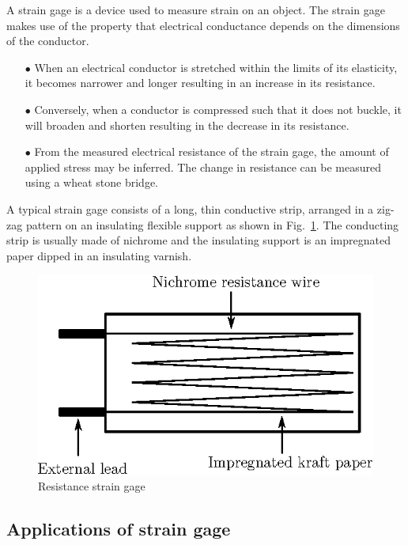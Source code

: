 A strain gage is a device used to measure strain on an object. The strain gage makes use of the property that electrical conductance depends on the dimensions of the conductor.
\begin{itemize}
\itemsep=0pt
\item[$\bullet$] When an electrical conductor is stretched within the limits of its elasticity, it becomes narrower and longer resulting in an increase in its resistance.

\item[$\bullet$] Conversely, when a conductor is compressed such that it does not buckle, it will broaden and shorten resulting in the decrease in its resistance. 

\item[$\bullet$] From the measured electrical resistance of the strain gage, the amount of applied stress may be inferred. The change in resistance can be measured using a wheat stone bridge.
\end{itemize}

A typical strain gage consists of a long, thin conductive strip, arranged in a zig-zag pattern on an insulating flexible support as shown in Fig.~\ref{fig8.7}. The conducting strip is usually made of nichrome and the insulating support is an impregnated paper dipped in an insulating varnish. 
\begin{figure}[H]
\centering
\includegraphics[scale=.9]{chap8/fig8.7.eps}
\smallskip
\caption{Resistance strain gage}\label{fig8.7}
\end{figure}

\subsection{Applications of strain gage}\label{sec8.6.1}


